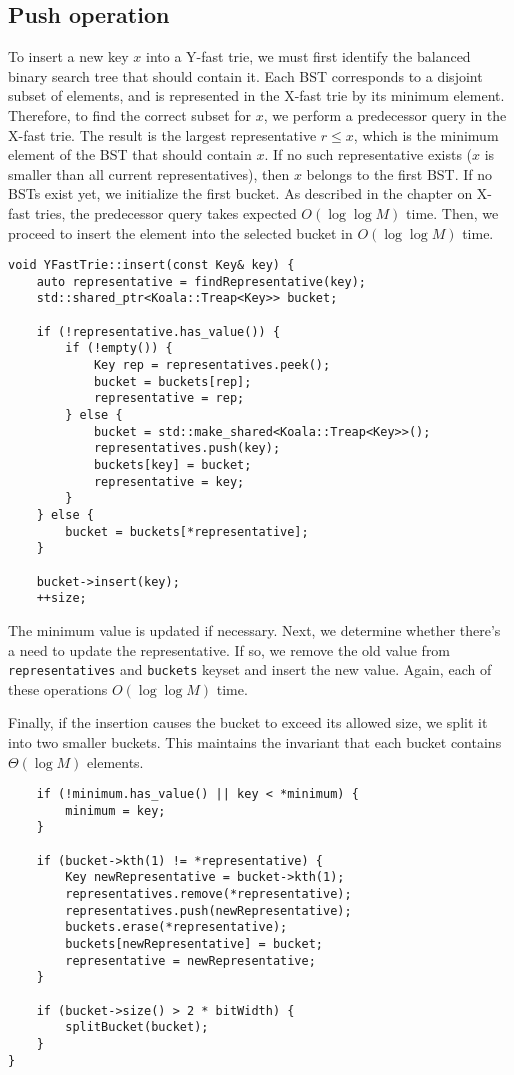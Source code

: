 \subsection{Push operation}

To insert a new key \( x \) into a Y-fast trie, we must first identify the balanced binary search tree that should contain it. Each BST corresponds to a disjoint subset of elements, and is represented in the X-fast trie by its minimum element. Therefore, to find the correct subset for \( x \), we perform a predecessor query in the X-fast trie. The result is the largest representative \( r \leq x \), which is the minimum element of the BST that should contain \( x \). If no such representative exists (\( x \) is smaller than all current representatives), then \( x \) belongs to the first BST. If no BSTs exist yet, we initialize the first bucket. As described in the chapter on X-fast tries, the predecessor query takes expected \( O(\log \log M) \) time. Then, we proceed to insert the element into the selected bucket in \( O(\log \log M) \) time.

\begin{verbatim}
void YFastTrie::insert(const Key& key) {
    auto representative = findRepresentative(key);
    std::shared_ptr<Koala::Treap<Key>> bucket;

    if (!representative.has_value()) {
        if (!empty()) {
            Key rep = representatives.peek();
            bucket = buckets[rep];
            representative = rep;
        } else {
            bucket = std::make_shared<Koala::Treap<Key>>();
            representatives.push(key);
            buckets[key] = bucket;
            representative = key;
        }
    } else {
        bucket = buckets[*representative];
    }

    bucket->insert(key);
    ++size;
\end{verbatim}

The minimum value is updated if necessary. Next, we determine whether there's a need to update the representative. If so, we remove the old value from \texttt{representatives} and \texttt{buckets} keyset and insert the new value. Again, each of these operations \( O(\log \log M) \) time.

Finally, if the insertion causes the bucket to exceed its allowed size, we split it into two smaller buckets. This maintains the invariant that each bucket contains \( \Theta(\log M) \) elements.

\begin{verbatim}
    if (!minimum.has_value() || key < *minimum) {
        minimum = key;
    }

    if (bucket->kth(1) != *representative) {
        Key newRepresentative = bucket->kth(1);
        representatives.remove(*representative);
        representatives.push(newRepresentative);
        buckets.erase(*representative);
        buckets[newRepresentative] = bucket;
        representative = newRepresentative;
    }

    if (bucket->size() > 2 * bitWidth) {
        splitBucket(bucket);
    }
}
\end{verbatim}

